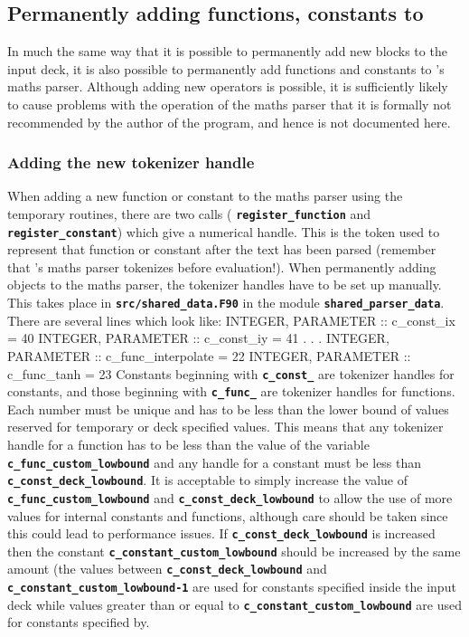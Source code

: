 \documentclass[12pt,a4paper]{article}
\newcommand{\inlinecode}[1]{{\color{warwickred} \bf\texttt{#1}}}
\newcommand{\EPOCH}{{\color{warwickdark}\fontfamily{phv}\selectfont{EPOCH}}}
\newenvironment{boxverbatim}{\lboxverbatim{none}}{\endlboxverbatim}
\begin{document}
\subsection{Permanently adding functions, constants to {\EPOCH}}
\label{sec:maths}
In much the same way that it is possible to permanently add new blocks to the
input deck, it is also possible to permanently add functions and constants to
{\EPOCH}'s maths parser. Although adding new operators is possible, it is
sufficiently likely to cause problems with the operation of the maths parser
that it is formally not recommended by the author of the program, and hence is
not documented here.

\subsubsection{Adding the new tokenizer handle}
When adding a new function or constant to the maths parser using the temporary
routines, there are two calls (\inlinecode{register\_function} and
\inlinecode{register\_constant}) which give a numerical handle. This is the
token used to represent that function or constant after the text has been parsed
(remember that {\EPOCH}'s maths parser tokenizes before evaluation!). When
permanently adding objects to the maths parser, the tokenizer handles have to
be set up manually. This takes place in \inlinecode{src/shared\_data.F90} in
the module \inlinecode{shared\_parser\_data}. There are several lines which
look like:
\begin{boxverbatim}
  INTEGER, PARAMETER :: c_const_ix = 40
  INTEGER, PARAMETER :: c_const_iy = 41
  .
  .
  .
  INTEGER, PARAMETER :: c_func_interpolate = 22
  INTEGER, PARAMETER :: c_func_tanh = 23
\end{boxverbatim}
Constants beginning with \inlinecode{c\_const\_} are tokenizer handles for
constants, and those beginning with \inlinecode{c\_func\_} are tokenizer handles
for functions. Each number must be unique and has to be less than
the lower bound of values reserved for temporary or deck
specified values. This means that any tokenizer handle for a function has to be
less than the value of the variable \inlinecode{c\_func\_custom\_lowbound} and
any handle for a constant must be less than
\inlinecode{c\_const\_deck\_lowbound}. It is acceptable to simply increase the
value of \inlinecode{c\_func\_custom\_lowbound} and
\inlinecode{c\_const\_deck\_lowbound} to
allow the use of more values for internal constants and functions, although
care should be taken since this could lead to performance issues.
If \inlinecode{c\_const\_deck\_lowbound} is increased then the constant
\inlinecode{c\_constant\_custom\_lowbound} should be increased by the same
amount (the values between \inlinecode{c\_const\_deck\_lowbound} and\linebreak
\inlinecode{c\_constant\_custom\_lowbound-1} are used for constants specified
inside the input deck while values greater than or equal to
\inlinecode{c\_constant\_custom\_lowbound} are used for constants specified
by\linebreak \inlinecode{register\_constant}.
\end{document}
